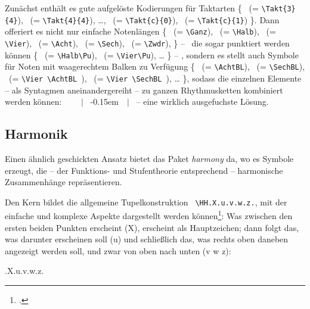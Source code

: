 Zunächst enthält es gute aufgelöste Kodierungen für Taktarten \{ 
 \ (= \texttt{\small \textbackslash{Takt}\{3\}\{4\}}),
 \ (= \texttt{\small \textbackslash{Takt}\{4\}\{4\}}),
\ldots,
 \ (= \texttt{\small \textbackslash{Takt}\{c\}\{0\}}),
 \ (= \texttt{\small \textbackslash{Takt}\{c\}\{1\}})
\}.
Dann offeriert es nicht nur einfache Notenlängen \{
\Ganz \ (= \texttt{\small \textbackslash{Ganz}}),
\Halb \ (= \texttt{\small \textbackslash{Halb}}),
\Vier \ (= \texttt{\small \textbackslash{Vier}}),
\Acht \ (= \texttt{\small \textbackslash{Acht}}),
\Sech \ (= \texttt{\small \textbackslash{Sech}}),
\Zwdr \ (= \texttt{\small \textbackslash{Zwdr}}),
\}  -- \ die sogar punktiert werden können 
\{
\Halb\Pu \ (= \texttt{\small \textbackslash{Halb}\textbackslash{Pu}}),
\Vier\Pu \ (= \texttt{\small \textbackslash{Vier}\textbackslash{Pu}}),
\ldots
\}
-- ,
sondern es stellt auch Symbole für Noten mit waagerechtem Balken zu Verfügung
\{
\AchtBL \ (= \texttt{\small \textbackslash{AchtBL}}),
\SechBL \ (= \texttt{\small \textbackslash{SechBL}}),
\Vier\AchtBL \ (= \texttt{\small \textbackslash{Vier} \textbackslash{AchtBL} }),
\Vier\SechBL \ (= \texttt{\small \textbackslash{Vier} \textbackslash{SechBL} }),
\ldots
\}, 
sodass die einzelnen Elemente -- als Syntagmen aneinandergereiht -- zu ganzen
Rhythmusketten kombiniert werden können:
 \Vier \ \Vier\AchtBL \ \Vier\Pu \ \Acht \ $|$ \AchtBR\Pu \SechBl \
\AchtBR\kern-0.15em\SechBR\Vier \ \SechBr\Vier\SechBl \ $|$ \ -- eine wirklich
ausgefuchste Lösung.

\subsection{\small Harmonik}

Einen ähnlich geschickten Ansatz bietet das Paket \textit{harmony} da, wo es
Symbole erzeugt, die -- der Funktions- und Stufentheorie entsprechend --
harmonische Zusammenhänge repräsentieren.

Den Kern bildet die allgemeine Tupelkonstruktion \texttt{\small
\textbackslash{HH.X.u.v.w.z.}}, mit der einfache und komplexe Aspekte
dargestellt werden können\footcite[vgl. dazu][2ff]{WegWeg2007a}: Was zwischen
den ersten beiden Punkten erscheint (X), erscheint als Hauptzeichen; dann folgt
das, was darunter erscheinen soll (u) und schließlich das, was rechts oben
daneben angezeigt werden soll, und zwar von oben nach unten (v w z):

\begin{center}
\HH.X.u.v.w.z.
\end{center}

